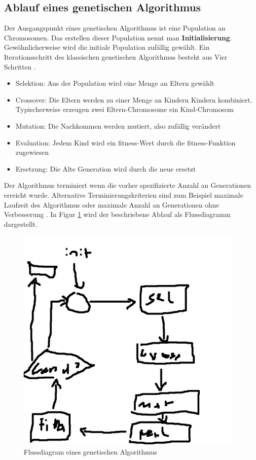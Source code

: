 \subsection{Ablauf eines genetischen Algorithmus}
Der Ausgangspunkt eines genetischen Algorithmus ist eine Population an Chromosomen. Das erstellen dieser Population nennt man \textbf{Initialisierung}. Gewöhnlicherweise wird die initiale Population zufällig gewählt. Ein Iterationsschritt des klassischen genetischen Algorithmus besteht aus Vier Schritten \cite*{GeneticAlgorithms}.
\begin{itemize}
    \item Selektion: Aus der Population wird eine Menge an Eltern gewählt
    \item Crossover: Die Eltern werden zu einer Menge an Kindern Kindern kombiniert. Typischerweise erzeugen zwei Eltern-Chromosome ein Kind-Chromosom
    \item Mutation: Die Nachkommen werden mutiert, also zufällig verändert
    \item Evaluation: Jedem Kind wird ein fitness-Wert durch die fitness-Funktion zugewiesen
    \item Ersetzung: Die Alte Generation wird durch die neue ersetzt
\end{itemize}
Der Algorithmus terminiert wenn die vorher spezifizierte Anzahl an Generationen erreicht wurde. Alternative Terminierungskriterien sind zum Beispiel maximale Laufzeit des Algorithmus oder maximale Anzahl an Generationen ohne Verbesserung \cite*{TerminologiesAndOperators}. In Figur \ref*{fig:genetic_algorithm_flowchart} wird der beschriebene Ablauf als Flussdiagramm dargestellt.
\begin{figure}[h!]
    \includegraphics[scale=1.0]{images/Genetic_Algorithm_Flowchart.png}
    \caption{Flussdiagram eines genetischen Algorithmus}
    \label{fig:genetic_algorithm_flowchart}
\end{figure}


